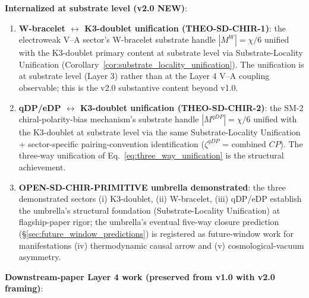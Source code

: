 \documentclass[11pt,letterpaper]{article}
\begin{document}
\textbf{Internalized at substrate level (v2.0 NEW)}:

\begin{enumerate}\setlength\itemsep{0.2em}
    \item \textbf{W-bracelet $\leftrightarrow$ K3-doublet unification (THEO-SD-CHIR-1)}: the electroweak V--A sector's W-bracelet substrate handle $|M^W| = \chi/6$ unified with the K3-doublet primary content at substrate level via Substrate-Locality Unification (Corollary~\ref{cor:substrate_locality_unification}). The unification is at substrate level (Layer 3) rather than at the Layer 4 V--A coupling observable; this is the v2.0 substantive content beyond v1.0.
    \item \textbf{qDP/eDP $\leftrightarrow$ K3-doublet unification (THEO-SD-CHIR-2)}: the SM-2 chiral-polarity-bias mechanism's substrate handle $|M^{qDP}| = \chi/6$ unified with the K3-doublet at substrate level via the same Substrate-Locality Unification + sector-specific pairing-convention identification ($\zeta^{qDP}$ = combined $CP$). The three-way unification of Eq.~\eqref{eq:three_way_unification} is the structural achievement.
    \item \textbf{OPEN-SD-CHIR-PRIMITIVE umbrella demonstrated}: the three demonstrated sectors (i) K3-doublet, (ii) W-bracelet, (iii) qDP/eDP establish the umbrella's structural foundation (Substrate-Locality Unification) at flagship-paper rigor; the umbrella's eventual five-way closure prediction (\S\ref{sec:future_window_predictions}) is registered as future-window work for manifestations (iv) thermodynamic causal arrow and (v) cosmological-vacuum asymmetry.
\end{enumerate}

\textbf{Downstream-paper Layer 4 work (preserved from v1.0 with v2.0 framing)}:
\end{document}

